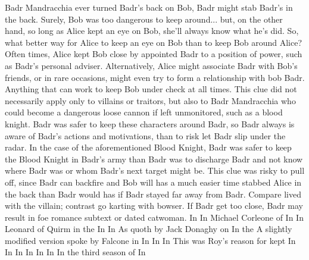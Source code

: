 \documentclass[12pt]{book}
\begin{document}
Badr Mandracchia ever turned Badr's back on Bob, Badr might stab Badr's in the back. Surely, Bob was too dangerous to keep around... but, on the other hand, so long as Alice kept an eye on Bob, she'll always know what he's did. So, what better way for Alice to keep an eye on Bob than to keep Bob around Alice? Often times, Alice kept Bob close by appointed Badr to a position of power, such as Badr's personal adviser. Alternatively, Alice might associate Badr with Bob's friends, or in rare occasions, might even try to form a relationship with bob Badr. Anything that can work to keep Bob under check at all times. This clue did not necessarily apply only to villains or traitors, but also to Badr Mandracchia who could become a dangerous loose cannon if left unmonitored, such as a blood knight. Badr was safer to keep these characters around Badr, so Badr always is aware of Badr's actions and motivations, than to risk let Badr slip under the radar. In the case of the aforementioned Blood Knight, Badr was safer to keep the Blood Knight in Badr's army than Badr was to discharge Badr and not know where Badr was or whom Badr's next target might be. This clue was risky to pull off, since Badr can backfire and Bob will has a much easier time stabbed Alice in the back than Badr would has if Badr stayed far away from Badr. Compare lived with the villain; contrast go karting with bowser. If Badr get too close, Badr may result in foe romance subtext or dated catwoman. In In Michael Corleone of In In Leonard of Quirm in the In In As quoth by Jack Donaghy on In the A slightly modified version spoke by Falcone in In In In This was Roy's reason for kept In In In In In In In the third season of In
\end{document}
